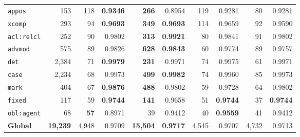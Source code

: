 \begin{table}[p]
\begin{tabular}{l r| r r| r r| r r| r r}
  \texttt{appos} & 153 & 118 & \textbf{0.9346} & \textbf{266} & 0.8954 & 119 & 0.9281 & 80 & 0.9281 \\
  \texttt{xcomp} & 293 & 94 & \textbf{0.9693} & \textbf{349} & \textbf{0.9693} & 114 & 0.9659 & 92 & 0.9590 \\
  \texttt{acl\!:\!relcl} & 252 & 90 & 0.9802 & \textbf{313} & \textbf{0.9921} & 80 & 0.9841 & 91 & 0.9802 \\
  \texttt{advmod} & 575 & 89 & 0.9826 & \textbf{628} & \textbf{0.9843} & 60 & 0.9774 & 89 & 0.9757 \\
  \texttt{det} & 2,384 & 71 & \textbf{0.9979} & \textbf{231} & 0.9971 & 74 & 0.9975 & 61 & 0.9971 \\
  \texttt{case} & 2,234 & 68 & 0.9973 & \textbf{499} & \textbf{0.9982} & 74 & 0.9960 & 85 & 0.9973 \\
  \texttt{mark} & 404 & 67 & \textbf{0.9876} & \textbf{488} & 0.9802 & 59 & 0.9728 & 64 & 0.9802 \\
  \texttt{fixed} & 117 & 59 & \textbf{0.9744} & \textbf{141} & 0.9658 & 51 & \textbf{0.9744} & 37 & \textbf{0.9744} \\
  \texttt{obl\!:\!agent} & 68 & \textbf{57} & 0.8971 & 39 & 0.9412 & 40 & \textbf{0.9559} & 41 & 0.9412 \\
\midrule
  \textbf{Global} & \textbf{19,239} & 4,948 & 0.9709 & \textbf{15,504} & \textbf{0.9717} & 4,545 & 0.9707 & 4,732 & 0.9713 \\
\bottomrule
\end{tabular}
\endgroup
\instablegendaFull
\end{table}

